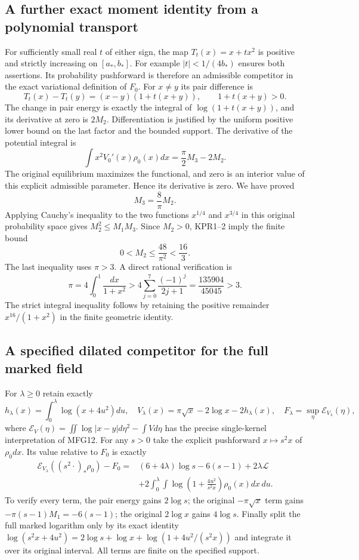 \subsection{A further exact moment identity from a polynomial transport}
For sufficiently small real $t$ of either sign, the map
$T_t(x)=x+tx^2$ is positive and strictly increasing on $[a_*,b_*]$.
For example $|t|<1/(4b_*)$ ensures both assertions. Its probability
pushforward is therefore an admissible competitor in the exact
variational definition of $F_0$. For $x\ne y$ its pair difference is
\[
 T_t(x)-T_t(y)=(x-y)(1+t(x+y)),\qquad 1+t(x+y)>0.
\]
The change in pair energy is exactly the integral of
$\log(1+t(x+y))$, and its derivative at zero is $2M_2$.
Differentiation is justified by the uniform positive lower bound on
the last factor and the bounded support. The derivative of the
potential integral is
\[
 \int x^2V_0'(x)\rho_0(x)dx
       =\frac\pi2M_3-2M_2.
\]
The original equilibrium maximizes the functional, and zero is an
interior value of this explicit admissible parameter. Hence its
derivative is zero. We have proved
\[
 \boxed{M_3=\frac8\pi M_2.}
 \tag{KPR2}
\]
Applying Cauchy's inequality to the two functions $x^{1/4}$ and
$x^{3/4}$ in this original probability space gives
$M_2^2\leq M_1M_3$. Since $M_2>0$, KPR1--2 imply the finite bound
\[
 \boxed{0<M_2\leq\frac{48}{\pi^2}<\frac{16}{3}.}
 \tag{KPR3}
\]
The last inequality uses $\pi>3$. A direct rational verification is
\[
 \pi=4\int_0^1\frac{dx}{1+x^2}
 >4\sum_{j=0}^{7}\frac{(-1)^j}{2j+1}
 =\frac{135904}{45045}>3.
\]
The strict integral inequality follows by retaining the positive
remainder $x^{16}/(1+x^2)$ in the finite geometric identity.

\subsection{A specified dilated competitor for the full marked field}
For $\lambda\geq0$ retain exactly
\[
 h_\lambda(x)=\int_0^\lambda\log(x+4u^2)du,
 \quad V_\lambda(x)=\pi\sqrt x-2\log x-2h_\lambda(x),
 \quad F_\lambda=\sup_\eta\mathcal E_{V_\lambda}(\eta),
 \tag{KPR4}
\]
where $\mathcal E_V(\eta)=\iint\log|x-y|d\eta^2-\int Vd\eta$
has the precise single-kernel interpretation of MFG12.
For any $s>0$ take the explicit pushforward $x\mapsto s^2x$ of
$\rho_0dx$. Its value relative to $F_0$ is exactly
\[
 \begin{split}
 \mathcal E_{V_\lambda}((s^2\cdot)_*\rho_0)-F_0
 ={}&(6+4\lambda)\log s-6(s-1)+2\lambda\mathcal L\\
 &+2\int_0^\lambda\int
       \log\left(1+\frac{4u^2}{s^2x}\right)\rho_0(x)dx\,du.
 \end{split}
 \tag{KPR5}
\]
To verify every term, the pair energy gains $2\log s$;
the original $-\pi\sqrt x$ term gains $-\pi(s-1)M_1=-6(s-1)$;
the original $2\log x$ gains $4\log s$.
Finally split the full marked logarithm only by its exact identity
$\log(s^2x+4u^2)=2\log s+\log x+
\log(1+4u^2/(s^2x))$ and integrate it over its original interval.
All terms are finite on the specified support.

